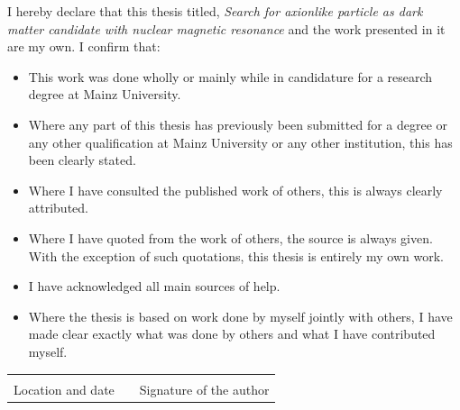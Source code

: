 
I hereby declare that this thesis titled, \textit{Search for axionlike particle as dark matter candidate with nuclear magnetic resonance} and the work presented in it are my own. I confirm that:
\begin{itemize}
    \item This work was done wholly or mainly while in candidature for a research degree at Mainz University.
    \item  Where any part of this thesis has previously been submitted for a degree or any other qualification at Mainz University or any other institution, this has been clearly stated.
    \item Where I have consulted the published work of others, this is always clearly attributed.
    \item Where I have quoted from the work of others, the source is always given. With the exception of such quotations, this thesis is entirely my own work.
    \item I have acknowledged all main sources of help.
    \item Where the thesis is based on work done by myself jointly with others, I have made clear exactly what was done by others and what I have contributed myself.
\end{itemize}




\vspace{2cm}

\begin{tabular}{p{6cm} p{1cm} p{6cm}}
\hrulefill & & \hrulefill \\
\footnotesize{Location and date} & & \footnotesize{Signature of the author}
\end{tabular}
